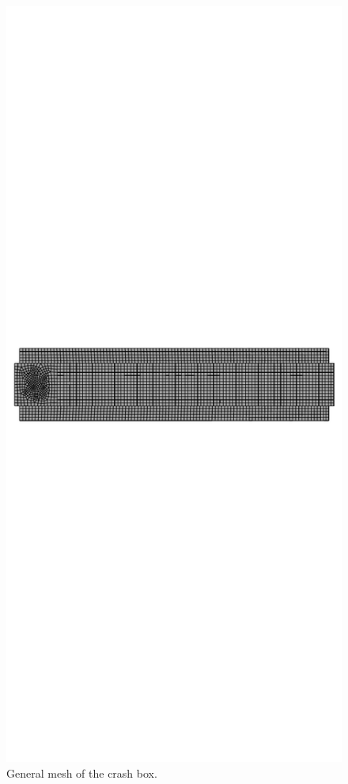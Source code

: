 \documentclass[cmfonts]{witpress}
\begin{document}
\begin{figure}
	\centering
	\includegraphics[width=0.9\linewidth]{figures/IMG_CUTRES/mesh}
	\caption{General mesh of the crash box.}
	\label{fig:mesh}
\end{figure}
\end{document}
